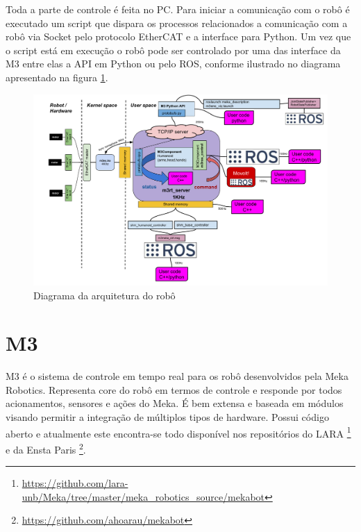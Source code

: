 Toda a parte de controle é feita no PC. Para iniciar a comunicação com o robô é executado um script que dispara os processos relacionados a comunicação com a robô via Socket pelo protocolo EtherCAT e a interface para Python. Um vez que o script está em execução o robô pode ser controlado por uma das interface da M3 entre elas a API em Python ou pelo ROS, conforme ilustrado no diagrama apresentado na figura \ref{fig:mekaarch}.

\begin{figure}[H]
    \centering
    \includegraphics[width=0.9\linewidth]{figs/m3_arch.pdf}
    \caption{Diagrama da arquitetura do robô \cite{hoarau_2015}}
    \label{fig:mekaarch}
\end{figure}

\section{M3}

M3 é o sistema de controle em tempo real para os robô desenvolvidos pela Meka Robotics. Representa core do robô em termos de controle e responde por todos acionamentos, sensores e ações do Meka. É bem extensa e baseada em módulos visando permitir a integração de múltiplos tipos de hardware. Possui código aberto e atualmente este encontra-se todo disponível nos repositórios do LARA \footnote{\url{https://github.com/lara-unb/Meka/tree/master/meka_robotics_source/mekabot}} e da Ensta Paris \footnote{\url{https://github.com/ahoarau/mekabot}}.


